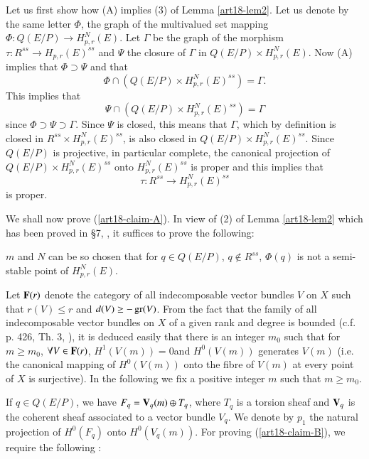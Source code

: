 Let us first show how (A) implies (3) of Lemma \ref{art18-lem2}. Let us denote by the same letter $\Phi$, the graph of the multivalued set mapping $\Phi:Q(E/P)\to H^{N}_{p,r}(E)$. Let $\Gamma$ be the graph of the morphism $\tau :R^{ss}\to H_{p,r}(E)^{ss}$ and $\Psi$ the closure of $\Gamma$ in $Q(E/P)\times H^{N}_{p,r}(E)$. Now (A) implies that $\Phi\supset \Psi$ and that
$$
\Phi\cap (Q(E/P)\times H^{N}_{p,r}(E)^{ss})=\Gamma.
$$
This implies that
$$
\Psi \cap (Q(E/P)\times H^{N}_{p,r}(E)^{ss})=\Gamma
$$
since $\Phi\supset \Psi\supset \Gamma$. Since $\Psi$ is closed, this means that $\Gamma$, which by definition is closed in $R^{ss}\times H^{N}_{p,r}(E)^{ss}$, is also closed in $Q(E/P)\times H^{N}_{p,r}(E)^{ss}$. Since $Q(E/P)$ is projective, in particular complete, the canonical projection of $Q(E/P)\times H^{N}_{p,r}(E)^{ss}$ onto $H^{N}_{p,r}(E)^{ss}$ is proper and this implies that
$$
\tau :R^{ss}\to H^{N}_{p,r}(E)^{ss}
$$
is proper.

We shall now prove (\ref{art18-claim-A}). In view of (2) of Lemma \ref{art18-lem2} which has been proved in \S7, \cite{art18-key12}, it suffices to prove the following:

\begin{alphaclaim}\label{art18-claim-B}
$m$ and $N$ can be so chosen that for $q\in Q(E/P)$, $q\not\in R^{ss}$, $\Phi(q)$ is not a semi-stable point of $H^{N}_{p,r}(E)$.
\end{alphaclaim}

Let $\mathbf{F}(r)$ denote the category of all indecomposable vector bundles $V$ on $X$ such that $r(V)\leq r$ and $d(V)\geq -\operatorname{\mathrm{gr}} (V)$. From the fact that the family of all indecomposable vector bundles on $X$ of a given rank and degree is bounded (c.f. p. 426, Th. 3, \cite{art18-key1}), it is deduced easily that there is an integer $m_{0}$ such that for $m\geq m_{0}$, $\forall V\in \mathbf{F}(r)$, $H^{1}(V(m))=0$\pageoriginale and $H^{0}(V(m))$ generates $V(m)$ (i.e. the canonical mapping of $H^{0}(V(m))$ onto the fibre of $V(m)$ at every point of $X$ is surjective). In the following we fix a positive integer $m$ such that $m\geq m_{0}$.

If $q\in Q(E/P)$, we have $F_{q}=\mathbf{V}_{q}(m)\oplus T_{q}$, where $T_{q}$ is a torsion sheaf and $\mathbf{V}_{q}$ is the coherent sheaf associated to a vector bundle $V_{q}$. We denote by $p_{1}$ the natural projection of $H^{0}(F_{q})$ onto $H^{0}(V_{q}(m))$. For proving (\ref{art18-claim-B}), we require the following :

